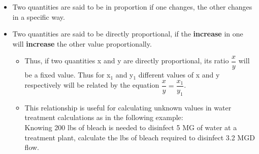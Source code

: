 \begin{itemize}
\item Two quantities are said to be in proportion if one changes, the other changes in a specific way.
\item Two quantities are said to be directly proportional, if the \textbf{increase} in one will \textbf{increase} the other value proportionally.  
\begin{itemize}
\item Thus, if two quantities x and y are directly proportional, its ratio $\dfrac{x}{y}$ will be a fixed value. Thus for x$_1$ and y$_1$ different values of x and y respectively will be related by the equation $\dfrac{x}{y}=\dfrac{x_1}{y_1}$.  

\item This relationship is useful for calculating unknown values in water treatment calculations as in the following example: \\
\vspace{0.2cm}
Knowing 200 lbs of bleach is needed to disinfect 5 MG of water at a treatment plant, calculate the lbs of bleach required to disinfect 3.2 MGD flow.\\

\vspace{0.2cm}


\end{itemize}
\end{itemize}

